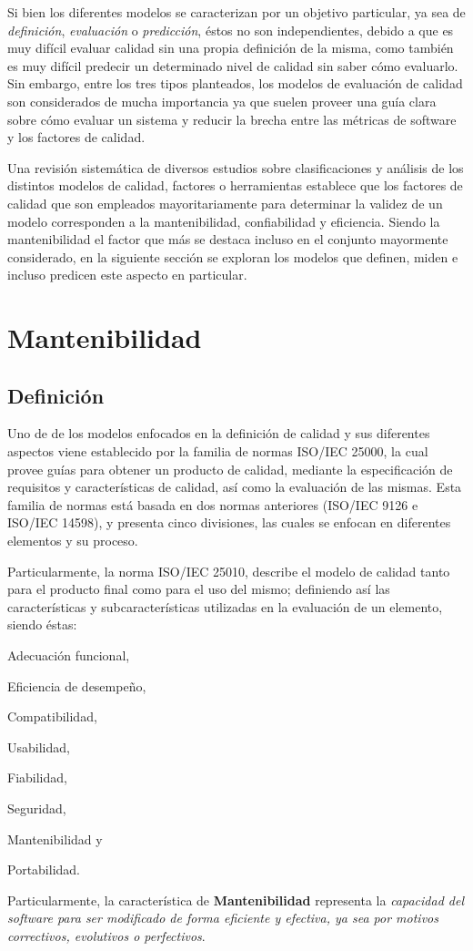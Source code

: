 Si bien los diferentes modelos se caracterizan por un objetivo particular, ya sea de
\textit{definición}, \textit{evaluación} o \textit{predicción}, éstos no son independientes,
debido a que es muy difícil evaluar calidad sin una propia definición de la misma, como también
es muy difícil predecir un determinado nivel de calidad sin saber cómo evaluarlo.
Sin embargo, entre los tres tipos planteados, los modelos de evaluación de calidad son considerados
de mucha importancia ya que suelen proveer una guía clara sobre cómo evaluar un sistema y reducir
la brecha entre las métricas de software y los factores de calidad.

Una revisión sistemática de diversos estudios sobre clasificaciones y análisis de los distintos
modelos de calidad, factores o herramientas \cite{Yan2019} establece que los factores de calidad
que son empleados mayoritariamente para determinar la validez de un modelo corresponden a la
mantenibilidad, confiabilidad y eficiencia.
Siendo la mantenibilidad el factor que más se destaca incluso en el conjunto mayormente
considerado, en la siguiente sección se exploran los modelos que definen, miden e incluso
predicen este aspecto en particular.

\section{Mantenibilidad}

\subsection{Definición}

Uno de de los modelos enfocados en la definición de calidad y sus diferentes aspectos
viene establecido por la familia de normas ISO/IEC 25000, 
la cual provee guías para obtener un producto de calidad, mediante la especificación 
de requisitos y características de calidad, así como la evaluación de las mismas.
Esta familia de normas está basada en dos normas anteriores (ISO/IEC 9126
e ISO/IEC 14598), y presenta cinco divisiones, las cuales se enfocan en diferentes
elementos y su proceso.

Particularmente, la norma ISO/IEC 25010, describe el modelo de calidad tanto para el producto
final como para el uso del mismo; definiendo así las características y subcaracterísticas
utilizadas en la evaluación de un elemento, siendo éstas:
\begin{inparaenum}[(1)]
    \item Adecuación funcional,
    \item Eficiencia de desempeño,
    \item Compatibilidad,
    \item Usabilidad,
    \item Fiabilidad,
    \item Seguridad,
    \item Mantenibilidad y
    \item Portabilidad.
\end{inparaenum}
Particularmente, la característica de \textbf{Mantenibilidad} representa la \textit{capacidad del
software para ser modificado de forma eficiente y efectiva, ya sea por motivos correctivos,
evolutivos o perfectivos}.

